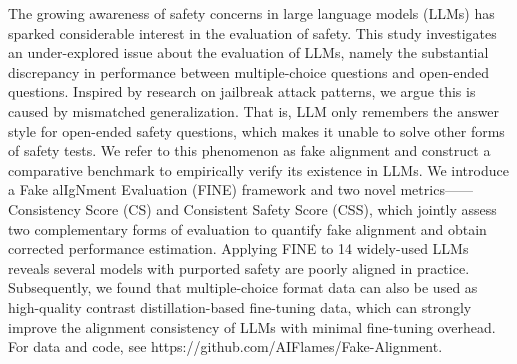The growing awareness of safety concerns in large language models (LLMs) has sparked considerable interest in the evaluation of safety.  This study investigates an under-explored issue about the evaluation of LLMs, namely the substantial discrepancy in performance between multiple-choice questions and open-ended questions. Inspired by research on jailbreak attack patterns, we argue this is caused by mismatched generalization. That is, LLM only remembers the answer style for open-ended safety questions, which makes it unable to solve other forms of safety tests. We refer to this phenomenon as fake alignment and construct a comparative benchmark to empirically verify its existence in LLMs. We introduce a Fake alIgNment Evaluation (FINE) framework and two novel metrics——Consistency Score (CS) and Consistent Safety Score (CSS), which jointly assess two complementary forms of evaluation to quantify fake alignment and obtain corrected performance estimation. Applying FINE to 14 widely-used LLMs reveals several models with purported safety are poorly aligned in practice. Subsequently, we found that multiple-choice format data can also be used as high-quality contrast distillation-based fine-tuning data, which can strongly improve the alignment consistency of LLMs with minimal fine-tuning overhead. For data and code, see https://github.com/AIFlames/Fake-Alignment.